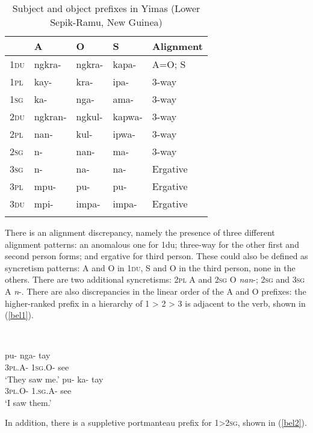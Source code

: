 \documentclass[output=paper,hidelinks]{langscibook}
\begin{document}
\begin{table}
\caption{Subject and object prefixes in Yimas (Lower Sepik-Ramu, New Guinea) \citep[200 ff.]{Foley1991}\label{tab3}}
\begin{tabularx}{\textwidth}{>{\scshape}XXXXl}
\lsptoprule
 & A & O & S & Alignment \\
 \midrule
1du & ngkra- & ngkra- & kapa- & A=O; S  \\
1pl & kay- & kra- & ipa- & 3-way  \\
1sg & ka- & nga- & ama- & 3-way \\
 \midrule
2du & ngkran- & ngkul- & kapwa- & 3-way \\
2pl & nan- & kul- & ipwa- & 3-way \\
2sg & n- & nan- & ma- & 3-way \\
 \midrule
3sg & n- & na- & na- & Ergative \\
3pl & mpu- & pu- & pu- & Ergative \\
3du & mpi- & impa- & impa- & Ergative \\
 \lspbottomrule
\end{tabularx}
\end{table}

There is an alignment discrepancy, namely the presence of three different alignment patterns:  an anomalous one for 1du; three-way for the other first and second person forms; and ergative for third person.  These could also be defined as syncretism patterns:  A and O in 1\textsc{du}, S and O in the third person, none in the others.  There are two additional syncretisms:  2\textsc{pl} A and 2\textsc{sg} O \textit{nan}-; 2\textsc{sg} and 3\textsc{sg} A \textit{n}-.  There are also discrepancies in the linear order of the A and O prefixes:  the higher-ranked prefix in a hierarchy of 1 > 2 > 3 is adjacent to the verb, shown in (\ref{bel1}).\largerpage[-1]

\ea \label{bel1}\\
    \begin{multicols}{2}\raggedcolumns
	\begin{xlist} 
	\ex 
		\gll pu- nga- tay\\ 
		3\textsc{pl}.A- \textsc{1sg}.O- see\\
		\glt ‘They saw me.’ 
	\columnbreak\ex 
		\gll pu- ka- tay\\
		3\textsc{pl}.O- 1.\textsc{sg}.A- see\\
		\glt ‘I saw them.’ 
	\end{xlist}
	\end{multicols}
 \z
In addition, there is a suppletive portmanteau prefix for 1>2\textsc{sg}, shown in (\ref{bel2}).
\end{document}
